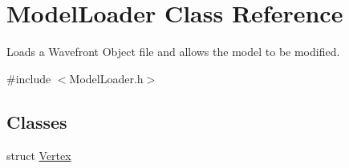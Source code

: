 \hypertarget{class_model_loader}{}\section{Model\+Loader Class Reference}
\label{class_model_loader}


Loads a Wavefront Object file and allows the model to be modified.  




{\ttfamily \#include $<$Model\+Loader.\+h$>$}

\subsection*{Classes}
\begin{DoxyCompactItemize}
\item 
struct \hyperlink{struct_model_loader_1_1_vertex}{Vertex}
\end{DoxyCompactItemize}
